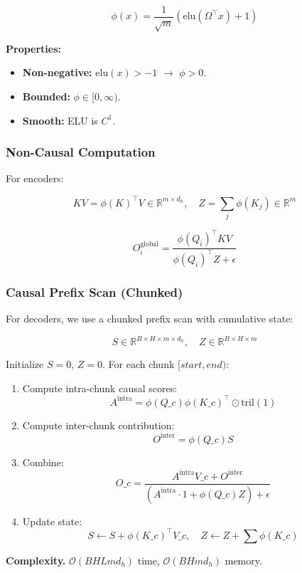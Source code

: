 \[
\phi(x) = \frac{1}{\sqrt{m}} \left(\mathrm{elu}(\Omega^\top x) + 1\right)
\tag{4.4}
\]

\textbf{Properties:}
\begin{itemize}
\item \textbf{Non-negative:} $\mathrm{elu}(x) > -1$ $\to$ $\phi > 0$.
\item \textbf{Bounded:} $\phi \in [0, \infty)$.
\item \textbf{Smooth:} ELU is $C^1$.

\end{itemize}
\subsubsection{Non-Causal Computation}

For encoders:

\[
KV = \phi(K)^\top V \in \mathbb{R}^{m \times d_h}, \quad
Z = \sum_j \phi(K_j) \in \mathbb{R}^m
\tag{4.5}
\]

\[
O_i^\text{global} = \frac{\phi(Q_i)^\top KV}{\phi(Q_i)^\top Z + \epsilon}
\tag{4.6}
\]

\subsubsection{Causal Prefix Scan (Chunked)}

For decoders, we use a chunked prefix scan with cumulative state:

\[
S \in \mathbb{R}^{B \times H \times m \times d_h}, \quad
Z \in \mathbb{R}^{B \times H \times m}
\]

Initialize $S = 0$, $Z = 0$. For each chunk $[start, end)$:

\begin{enumerate}
\item Compute intra-chunk causal scores:
  $$
  A^\text{intra} = \phi(Q\_c) \phi(K\_c)^\top \odot \text{tril}(1)
  \tag{4.7}
  $$

\item Compute inter-chunk contribution:
  $$
  O^\text{inter} = \phi(Q\_c) S
  \tag{4.8}
  $$

\item Combine:
  $$
  O\_c = \frac{A^\text{intra} V\_c + O^\text{inter}}{(A^\text{intra} \cdot 1 + \phi(Q\_c) Z) + \epsilon}
  \tag{4.9}
  $$

\item Update state:
  $$
  S \leftarrow S + \phi(K\_c)^\top V\_c, \quad Z \leftarrow Z + \sum \phi(K\_c)
  \tag{4.10}
  $$

\end{enumerate}
\textbf{Complexity.} $\mathcal{O}(B H L m d_h)$ time, $\mathcal{O}(B H m d_h)$ memory.

